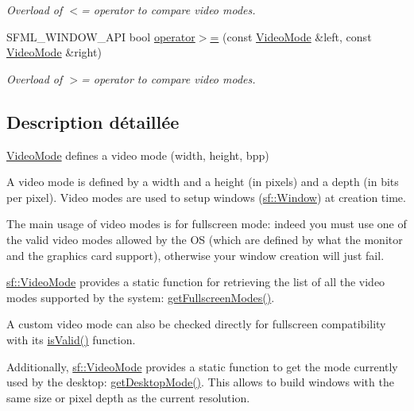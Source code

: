 \begin{DoxyCompactItemize}
\begin{DoxyCompactList}\small\item\em Overload of $<$= operator to compare video modes. \end{DoxyCompactList}\item 
S\+F\+M\+L\+\_\+\+W\+I\+N\+D\+O\+W\+\_\+\+A\+PI bool \hyperlink{classsf_1_1VideoMode_a7f7983e336203d34c9878c77fff60f1f}{operator$>$=} (const \hyperlink{classsf_1_1VideoMode}{Video\+Mode} \&left, const \hyperlink{classsf_1_1VideoMode}{Video\+Mode} \&right)
\begin{DoxyCompactList}\small\item\em Overload of $>$= operator to compare video modes. \end{DoxyCompactList}\end{DoxyCompactItemize}


\subsection{Description détaillée}
\hyperlink{classsf_1_1VideoMode}{Video\+Mode} defines a video mode (width, height, bpp) 

A video mode is defined by a width and a height (in pixels) and a depth (in bits per pixel). Video modes are used to setup windows (\hyperlink{classsf_1_1Window}{sf\+::\+Window}) at creation time.

The main usage of video modes is for fullscreen mode\+: indeed you must use one of the valid video modes allowed by the OS (which are defined by what the monitor and the graphics card support), otherwise your window creation will just fail.

\hyperlink{classsf_1_1VideoMode}{sf\+::\+Video\+Mode} provides a static function for retrieving the list of all the video modes supported by the system\+: \hyperlink{classsf_1_1VideoMode_a6815b9b3b35767d5b4563fbed4bfc67b}{get\+Fullscreen\+Modes()}.

A custom video mode can also be checked directly for fullscreen compatibility with its \hyperlink{classsf_1_1VideoMode_ad5e04c044b0925523c75ecb173d2129a}{is\+Valid()} function.

Additionally, \hyperlink{classsf_1_1VideoMode}{sf\+::\+Video\+Mode} provides a static function to get the mode currently used by the desktop\+: \hyperlink{classsf_1_1VideoMode_ac1be160a4342e6eafb2cb0e8c9b18d44}{get\+Desktop\+Mode()}. This allows to build windows with the same size or pixel depth as the current resolution.

